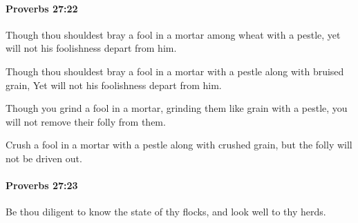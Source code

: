		\paragraph{Proverbs 27:22} %
			\label{PROVERBS-27-22}

			Though thou shouldest bray a fool in a mortar among wheat with a pestle, yet will not his foolishness depart from him.

			\begin{versebox}
					\item[BHS] 
					\item[ASV] Though thou shouldest bray a fool in a mortar with a pestle along with bruised grain, Yet will not his foolishness depart from him.
					\item[NIV] Though you grind a fool in a mortar, grinding them like grain with a pestle, you will not remove their folly from them.
					\item[NRSV] Crush a fool in a mortar with a pestle along with crushed grain, but the folly will not be driven out.
			\end{versebox}

		\paragraph{Proverbs 27:23} %
			\label{PROVERBS-27-23}

			Be thou diligent to know the state of thy flocks, and look well to thy herds.

